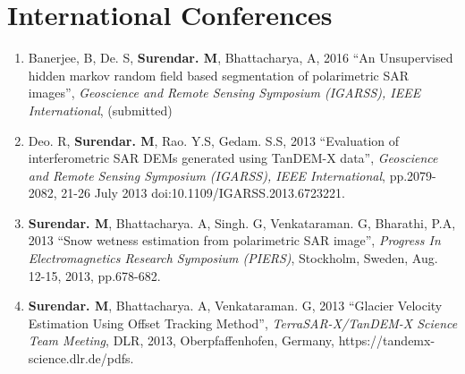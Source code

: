 \section*{International Conferences}
  \begin{enumerate}
  \item Banerjee, B, De. S, \textbf{Surendar. M}, Bhattacharya, A, 2016 \textquotedblleft An Unsupervised hidden markov random field based segmentation of polarimetric SAR images\textquotedblright, \textit{Geoscience and Remote Sensing Symposium (IGARSS), IEEE International}, (submitted)
  
  \item Deo. R, \textbf{Surendar. M}, Rao. Y.S, Gedam. S.S, 2013 \textquotedblleft Evaluation of interferometric SAR DEMs generated using TanDEM-X data\textquotedblright, \textit{Geoscience and Remote Sensing Symposium (IGARSS), IEEE International}, pp.2079-2082, 21-26 July 2013 \break doi:10.1109/IGARSS.2013.6723221.

\item \textbf{Surendar. M}, Bhattacharya. A, Singh. G, Venkataraman. G, Bharathi, P.A, 2013 \textquotedblleft Snow wetness estimation from polarimetric SAR image\textquotedblright, \textit{Progress In Electromagnetics Research Symposium (PIERS)}, Stockholm, Sweden, Aug. 12-15, 2013, pp.678-682.

\item \textbf{Surendar. M}, Bhattacharya. A, Venkataraman. G, 2013 \textquotedblleft Glacier Velocity Estimation Using Offset Tracking Method\textquotedblright, \textit{TerraSAR-X/TanDEM-X Science Team Meeting}, DLR, 2013, Oberpfaffenhofen, Germany, https://tandemx-science.dlr.de/pdfs.



\end{enumerate}
